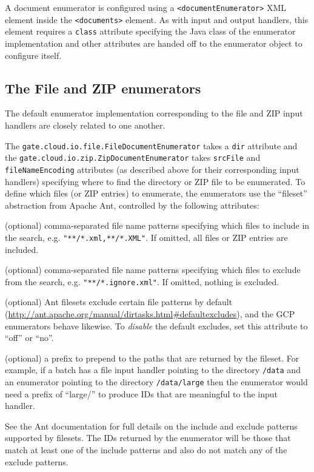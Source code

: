 A document enumerator is configured using a \verb!<documentEnumerator>! XML
element inside the \verb!<documents>! element.  As with input and output
handlers, this element requires a \verb!class! attribute specifying the Java
class of the enumerator implementation and other attributes are handed off to
the enumerator object to configure itself.

\subsection{The File and ZIP enumerators}

The default enumerator implementation corresponding to the file and ZIP input
handlers are closely related to one another.

The \verb!gate.cloud.io.file.FileDocumentEnumerator! takes a \verb!dir!
attribute and the \verb!gate.cloud.io.zip.ZipDocumentEnumerator! takes
\verb!srcFile! and \verb!fileNameEncoding! attributes (as described above for
their corresponding input handlers) specifying where to find the directory
or ZIP file to be enumerated.  To define which files (or ZIP entries) to
enumerate, the enumerators use the ``fileset'' abstraction from Apache Ant,
controlled by the following attributes:

\bde
\item[includes] (optional) comma-separated file name patterns specifying which
  files to include in the search, e.g. \verb!"**/*.xml,**/*.XML"!.  If
  omitted, all files or ZIP entries are included.
\item[excludes] (optional) comma-separated file name patterns specifying which
  files to exclude from the search, e.g. \verb!"**/*.ignore.xml"!.  If omitted,
  nothing is excluded.
\item[defaultExcludes] (optional) Ant filesets exclude certain file patterns by
  default (\url{http://ant.apache.org/manual/dirtasks.html#defaultexcludes}),
  and the GCP enumerators behave likewise.  To {\em disable} the default
  excludes, set this attribute to ``off'' or ``no''.
\item[prefix] (optional) a prefix to prepend to the paths that are returned by
  the fileset.  For example, if a batch has a file input handler pointing to
  the directory \verb!/data! and an enumerator pointing to the directory
  \verb!/data/large! then the enumerator would need a prefix of ``large/'' to
  produce IDs that are meaningful to the input handler.
\ede

See the Ant documentation for full details on the include and exclude patterns
supported by filesets.  The IDs returned by the enumerator will be those that
match at least one of the include patterns and also do not match any of the
exclude patterns.

